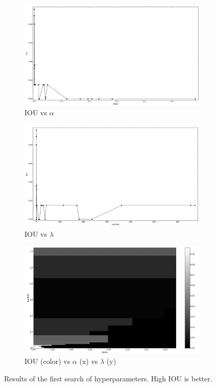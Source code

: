 \begin{figure}[h]
	\centering
	\begin{subfigure}{0.32\textwidth}
		\centering
                \includegraphics[width=\textwidth]{plots/hs1_alpha.png}
         \caption{IOU vs $\alpha$}
	\end{subfigure}
	\begin{subfigure}{0.32\textwidth}
		\centering
                \includegraphics[width=\textwidth]{plots/hs1_lambda.png}
         \caption{IOU vs $\lambda$}
	\end{subfigure}
	\begin{subfigure}{0.32\textwidth}
		\centering
                \includegraphics[width=\textwidth]{plots/hs1_pcolor.png}
         \caption{IOU (color) vs $\alpha$ (x) vs $\lambda$ (y)}
	\end{subfigure}
	\caption[First hyperparameter search for Experiment 1]{Results of the first search of hyperparameters. High IOU is better.}
	 \label{fig:Hs1}
\end{figure}

